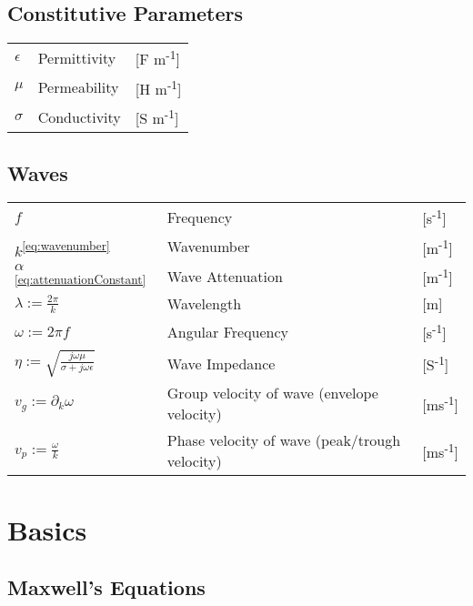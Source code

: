 \documentclass{article}
\begin{document}
\subsection*{Constitutive Parameters}
\begin{tabular}{ m{7em} m{24em} m{4em} }
    \( \displaystyle \epsilon \) & Permittivity & [F m\textsuperscript{-1}] \\
    \( \displaystyle \mu \) & Permeability & [H m\textsuperscript{-1}] \\
    \( \displaystyle \sigma \) & Conductivity & [S m\textsuperscript{-1}] \\
\end{tabular}
\subsection*{Waves}
\begin{tabular}{ m{7em} m{24em} m{4em} }
    \( \displaystyle f \) & Frequency & [s\textsuperscript{-1}] \\
    \( \displaystyle k \)\textsuperscript{\eqref{eq:wavenumber}} & Wavenumber & [m\textsuperscript{-1}]  \\
    \( \displaystyle \alpha \)\textsuperscript{\eqref{eq:attenuationConstant}} & Wave Attenuation & [m\textsuperscript{-1}]  \\
    \( \displaystyle \lambda := \frac{2 \pi}{k} \) & Wavelength & [m] \\
    \( \displaystyle \omega := 2 \pi f \) & Angular Frequency & [s\textsuperscript{-1}] \\
    \( \displaystyle \eta := \sqrt{\frac{j \omega \mu}{\sigma + j \omega \epsilon}} \) & Wave Impedance & [S\textsuperscript{-1}] \\
    \( \displaystyle v_g := \partial_k \omega \) & Group velocity of wave (envelope velocity) & [ms\textsuperscript{-1}]  \\
    \( \displaystyle v_p := \frac{\omega}{k} \) & Phase velocity of wave (peak/trough velocity) & [ms\textsuperscript{-1}]  \\
\end{tabular}
\normalsize
\newpage
\section{Basics}
\subsection{Maxwell's Equations}
\end{document}
